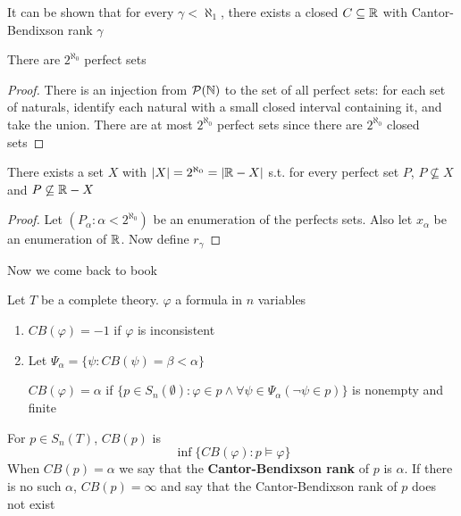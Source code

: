 \documentclass[11pt]{article}
\begin{document}
It can be shown that for every \(\gamma<\aleph_1\), there exists a closed \(C\subseteq\mathbb{R}\) with Cantor-Bendixson
rank \(\gamma\)

\begin{lemma}[]
There are \(2^{\aleph_0}\) perfect sets
\end{lemma}

\begin{proof}
There is an injection from \(\mathcal{P}(\mathbb{N})\) to the set of all perfect sets: for each set of naturals,
identify each natural with a small closed interval containing it, and take the union. There are
at most \(2^{\aleph_0}\) perfect sets since there are \(2^{\aleph_0}\) closed sets
\end{proof}

\begin{theorem}[]
There exists a set \(X\) with \(\abs{X}=2^{\aleph_0}=\abs{\R-X}\) s.t. for every perfect
set \(P\), \(P\not\subseteq X\) and \(P\not\subseteq\mathbb{R}-X\)
\end{theorem}

\begin{proof}
Let \((P_\alpha:\alpha<2^{\aleph_0})\) be an enumeration of the perfects sets. Also let \(x_\alpha\) be an
enumeration of \(\mathbb{R}\). Now define \(r_\gamma\)
\end{proof}


Now we come back to book

\begin{definition}[]
Let \(T\) be a complete theory. \(\varphi\) a formula in \(n\) variables
\begin{enumerate}
\item \(CB(\varphi)=-1\) if \(\varphi\) is inconsistent
\item Let \(\Psi_\alpha=\{\psi:CB(\psi)=\beta<\alpha\}\)

\(CB(\varphi)=\alpha\) if \(\{p\in S_n(\emptyset):\varphi\in p\wedge\forall\psi\in\Psi_\alpha(\neg\psi\in p)\}\) is nonempty and finite
\end{enumerate}


For \(p\in S_n(T)\), \(CB(p)\) is
\begin{equation*}
\inf\{CB(\varphi):p\vDash\varphi\}
\end{equation*}
When \(CB(p)=\alpha\) we say that the \textbf{Cantor-Bendixson rank} of \(p\) is \(\alpha\). If there is no such
\(\alpha\), \(CB(p)=\infty\) and say that the Cantor-Bendixson rank of \(p\) does not exist
\end{definition}
\end{document}
